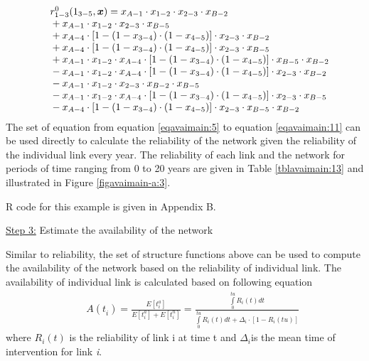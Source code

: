 \begin{eqnarray}
&& \begin{array}{l}
r_{1 - 3}^0({1_{3 - 5}},\vec x) = {x_{A - 1}} \cdot {x_{1 - 2}} \cdot {x_{2 -
3}} \cdot {x_{B - 2}}\\
{\rm{                 }} + {x_{A - 1}} \cdot {x_{1 - 2}} \cdot {x_{2 - 3}} \cdot
{x_{B - 5}}\\
{\rm{                 }} + {x_{A - 4}} \cdot \left[ {1 - (1 - {x_{3 - 4}}) \cdot
(1 - {x_{4 - 5}})} \right] \cdot {x_{2 - 3}} \cdot {x_{B - 2}}\\
{\rm{                 }} + {x_{A - 4}} \cdot \left[ {1 - (1 - {x_{3 - 4}}) \cdot
(1 - {x_{4 - 5}})} \right] \cdot {x_{2 - 3}} \cdot {x_{B - 5}}\\
{\rm{                 }} + {x_{A - 1}} \cdot {x_{1 - 2}} \cdot {x_{A - 4}} \cdot
\left[ {1 - (1 - {x_{3 - 4}}) \cdot (1 - {x_{4 - 5}})} \right] \cdot {x_{B - 5}}
\cdot {x_{B - 2}}\\
{\rm{                 }} - {x_{A - 1}} \cdot {x_{1 - 2}} \cdot {x_{A - 4}} \cdot
\left[ {1 - (1 - {x_{3 - 4}}) \cdot (1 - {x_{4 - 5}})} \right] \cdot {x_{2 - 3}}
\cdot {x_{B - 2}}\\
{\rm{                 }} - {x_{A - 1}} \cdot {x_{1 - 2}} \cdot {x_{2 - 3}} \cdot
{x_{B - 2}} \cdot {x_{B - 5}}\\
{\rm{                 }} - {x_{A - 1}} \cdot {x_{1 - 2}} \cdot {x_{A - 4}} \cdot
\left[ {1 - (1 - {x_{3 - 4}}) \cdot (1 - {x_{4 - 5}})} \right] \cdot {x_{2 - 3}}
\cdot {x_{B - 5}}\\
{\rm{                 }} - {x_{A - 4}} \cdot \left[ {1 - (1 - {x_{3 - 4}}) \cdot
(1 - {x_{4 - 5}})} \right] \cdot {x_{2 - 3}} \cdot {x_{B - 5}} \cdot {x_{B - 2}}
\end{array}
\label{eqavaimain:10}
\end{eqnarray}
The set of equation from equation \eqref{eqavaimain:5} to equation \eqref{eqavaimain:11} can be used
directly to calculate the reliability of the network given the reliability of the
individual link every year. The reliability of each link and the network for
periods of time ranging from 0 to 20 years are given in Table \ref{tblavaimain:13} and
illustrated in Figure \ref{figavaimain-a:3}. 

R code for this example is given in Appendix B.

\underline{Step 3:} Estimate the availability of the network

Similar to reliability, the set of structure functions above can be used
to compute the availability of the network based on the reliability of individual
link. The availability of individual link is calculated based on following
equation
\begin{eqnarray}
&& A(t_i^{}) = \frac{{E\left[ {t_i^a} \right]}}{{E\left[ {t_i^a} \right] + E\left[
{t_i^n} \right]}} = \frac{{\int\limits_0^{tu} {{R_i}(t)dt} }}{{\int\limits_0^{tu}
{{R_i}(t)dt}  + {\Delta _i} \cdot \left[ {1 - {R_i}(tu)} \right]}}
\label{eqavaimain:11}
\end{eqnarray}
where ${R_i}(t)$ is the reliability of link i at time t and ${\Delta
_i}$is the mean time of intervention for link \textit{i}.

